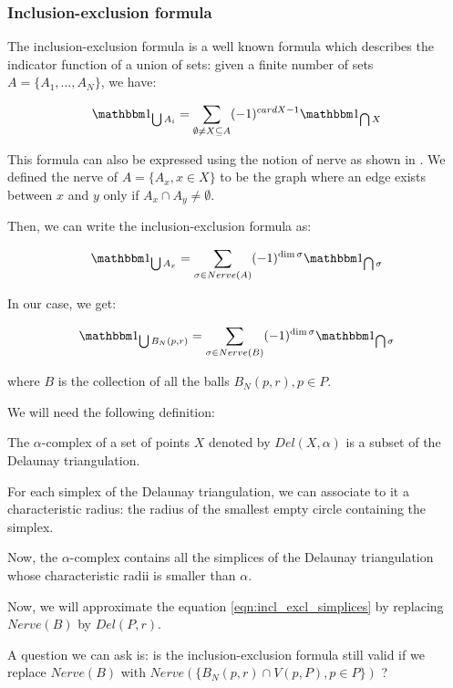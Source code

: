 \subsubsection{Inclusion-exclusion formula}

The inclusion-exclusion formula is a well known formula which describes the
indicator function of a union of sets: given a finite number of sets $ A = \{
A_1, \ldots, A_N \} $, we have:

$$ \indicator{\bigcup A_i} = \sum_{\emptyset \neq X \subseteq A} (-1)^{card X -
    1} \indicator{\bigcap X} $$

This formula can also be expressed using the notion of nerve as shown in
\cite{attali2007inclusion}. We defined the nerve of $ A = \{ A_x, x \in X \} $
to be the graph where an edge exists between $ x $ and $ y $ only if $ A_x \cap
A_y \neq \emptyset $.

Then, we can write the inclusion-exclusion formula as:

$$ \indicator{\bigcup A_x} = \sum_{\sigma \in Nerve(A)} (-1)^{\dim \sigma}
\indicator{\bigcap \sigma} $$

In our case, we get:

\begin{equation}
    \indicator{\bigcup B_N(p, r)} = \sum_{\sigma \in Nerve(B)} (-1)^{\dim \sigma}
    \indicator{\bigcap \sigma}
    \label{eqn:incl_excl_simplices}
\end{equation}

where $ B $ is the collection of all the balls $ B_N(p, r), p \in P $.

We will need the following definition:
\begin{definition}
    The $\alpha$-complex of a set of points $ X $ denoted by $ Del(X, \alpha) $
    is a subset of the Delaunay triangulation.

    For each simplex of the Delaunay triangulation, we can associate to it a
    characteristic radius: the radius of the smallest empty circle containing
    the simplex.

    Now, the $\alpha$-complex contains all the simplices of the Delaunay
    triangulation whose characteristic radii is smaller than $\alpha$.
\end{definition}

Now, we will approximate the equation \ref{eqn:incl_excl_simplices} by replacing $ Nerve(B)
$ by $ Del(P, r) $.


A question we can ask is: is the inclusion-exclusion formula still valid if we
replace $ Nerve(B) $ with $ Nerve(\{ B_N(p, r) \cap V(p, P), p \in P\}) $ ?


